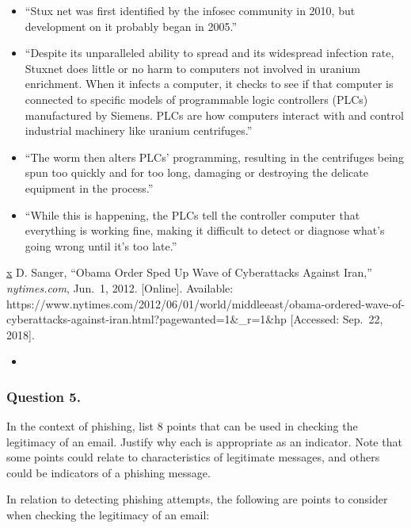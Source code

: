 \documentclass[11pt]{article}
\providecommand{\tightlist}{%
      \setlength{\itemsep}{0pt}\setlength{\parskip}{0pt}}
\begin{document}
\begin{itemize}
\tightlist
\item
  ``Stux net was first identified by the infosec community in 2010, but
  development on it probably began in 2005.''
\item
  ``Despite its unparalleled ability to spread and its widespread
  infection rate, Stuxnet does little or no harm to computers not
  involved in uranium enrichment. When it infects a computer, it checks
  to see if that computer is connected to specific models of
  programmable logic controllers (PLCs) manufactured by Siemens. PLCs
  are how computers interact with and control industrial machinery like
  uranium centrifuges.''
\item
  ``The worm then alters PLCs' programming, resulting in the centrifuges
  being spun too quickly and for too long, damaging or destroying the
  delicate equipment in the process.''
\item
  ``While this is happening, the PLCs tell the controller computer that
  everything is working fine, making it difficult to detect or diagnose
  what's going wrong until it's too late.''
\end{itemize}

\href{https://www.ted.com/talks/ralph_langner_cracking_stuxnet_a_21st_century_cyberweapon}{x}
D. Sanger, ``Obama Order Sped Up Wave of Cyberattacks Against Iran,''
\emph{nytimes.com}, Jun.~1, 2012. {[}Online{]}. Available:
https://www.nytimes.com/2012/06/01/world/middleeast/obama-ordered-wave-of-cyberattacks-against-iran.html?pagewanted=1\&\_r=1\&hp
{[}Accessed: Sep.~22, 2018{]}.

\begin{itemize}
\item
\end{itemize}

    \hypertarget{question-5.}{%
\subsubsection{Question 5.}\label{question-5.}}

In the context of phishing, list 8 points that can be used in checking
the legitimacy of an email. Justify why each is appropriate as an
indicator. Note that some points could relate to characteristics of
legitimate messages, and others could be indicators of a phishing
message.

    In relation to detecting phishing attempts, the following are points to
consider when checking the legitimacy of an email:
\end{document}
